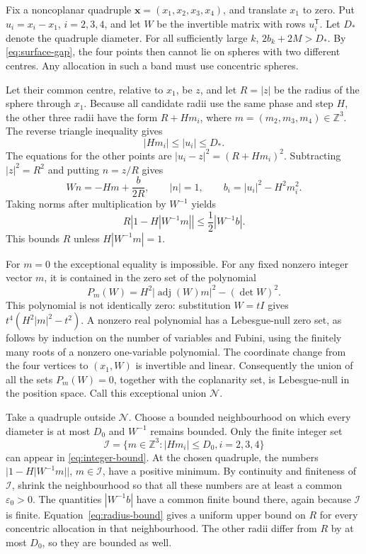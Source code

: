 \documentclass[11pt,a4paper]{article}
\numberwithin{equation}{section}
\theoremstyle{definition}
\theoremstyle{remark}
\DeclareMathOperator{\adj}{adj}
\begin{document}
Fix a noncoplanar quadruple $\mathbf x=(x_1,x_2,x_3,x_4)$, and translate
$x_1$ to zero. Put $u_i=x_i-x_1$, $i=2,3,4$, and let $W$ be the
invertible matrix with rows $u_i^{\mathsf T}$. Let $D_*$ denote the
quadruple diameter. For all sufficiently large $k$,
$2b_k+2M>D_*$. By \eqref{eq:surface-gap}, the four points then cannot
lie on spheres with two different centres. Any allocation in such a band
must use concentric spheres.

Let their common centre, relative to $x_1$, be $z$, and let $R=|z|$ be
the radius of the sphere through $x_1$. Because all candidate radii use
the same phase and step $H$, the other three radii have the form
$R+Hm_i$, where $m=(m_2,m_3,m_4)\in\mathbb Z^3$. The reverse triangle
inequality gives
\begin{equation}
 |Hm_i|\leq|u_i|\leq D_*.
 \label{eq:integer-bound}
\end{equation}
The equations for the other points are
$|u_i-z|^2=(R+Hm_i)^2$. Subtracting $|z|^2=R^2$ and putting $n=z/R$
gives
\begin{equation}
 Wn=-Hm+\frac b{2R},\qquad |n|=1,
 \qquad b_i=|u_i|^2-H^2m_i^2.
 \label{eq:concentric-equations}
\end{equation}
Taking norms after multiplication by $W^{-1}$ yields
\begin{equation}
 R\left|1-H|W^{-1}m|\right|
 \leq\frac12|W^{-1}b|.
 \label{eq:radius-bound}
\end{equation}
This bounds $R$ unless $H|W^{-1}m|=1$.

For $m=0$ the exceptional equality is impossible. For any fixed nonzero
integer vector $m$, it is contained in the zero set of the polynomial
\begin{equation}
 P_m(W)=H^2|\adj(W)m|^2-(\det W)^2.
 \label{eq:resonance-polynomial}
\end{equation}
This polynomial is not identically zero: substitution $W=tI$ gives
$t^4(H^2|m|^2-t^2)$. A nonzero real polynomial has a Lebesgue-null zero
set, as follows by induction on the number of variables and Fubini,
using the finitely many roots of a nonzero one-variable polynomial.
The coordinate change from the four vertices to $(x_1,W)$ is invertible
and linear. Consequently the union of all the sets $P_m(W)=0$, together
with the coplanarity set, is Lebesgue-null in the position space.
Call this exceptional union $\mathcal N$.

Take a quadruple outside $\mathcal N$. Choose a bounded neighbourhood on
which every diameter is at most $D_0$ and $W^{-1}$ remains bounded. Only
the finite integer set
\[
 \mathcal I=\{m\in\mathbb Z^3: |Hm_i|\leq D_0, i=2,3,4\}
\]
can appear in \eqref{eq:integer-bound}. At the chosen quadruple, the
numbers $|1-H|W^{-1}m||$, $m\in\mathcal I$, have a positive minimum.
By continuity and finiteness of $\mathcal I$, shrink the neighbourhood
so that all these numbers are at least a common $\varepsilon_0>0$.
The quantities $|W^{-1}b|$ have a common finite bound there, again because
$\mathcal I$ is finite. Equation~\eqref{eq:radius-bound} gives a uniform
upper bound on $R$ for every concentric allocation in that neighbourhood.
The other radii differ from $R$ by at most $D_0$, so they are bounded
as well.
\end{document}
